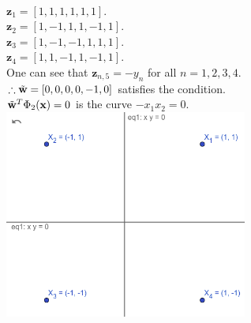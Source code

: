 \newcommand{\z}{\mathbf{z}}

\begin{pr}$ $\\
$\z_1=[1, 1, 1, 1, 1, 1]$.\\
$\z_2=[1, -1, 1, 1, -1, 1]$.\\
$\z_3=[1, -1, -1, 1, 1, 1]$.\\
$\z_4=[1, 1, -1, 1, -1, 1]$.\\
One can see that $\z_{n, 5}=-y_n$ for all $n=1, 2, 3, 4$.\\
$\therefore\tilde{\mathbf{w}}=[0, 0, 0, 0, -1, 0]$ satisfies the condition.\\
$\tilde{\mathbf{w}}^T\Phi_2(\mathbf{x})=0$ is the curve $-x_1x_2=0$.\\
\includegraphics[width=8cm]{p3.png}
\end{pr}
